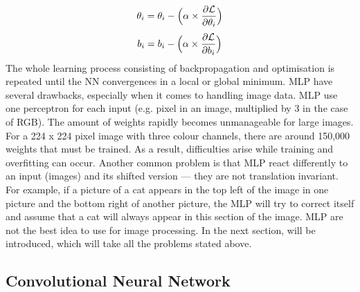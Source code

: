 \begin{equation}
    \centering
    \theta_i = \theta_i - \Big(\alpha \times \frac{\partial \mathcal{L}}{\partial\theta_i}\Big)
    \label{eq:Optimisation-Gradient-Descent-Weights}
\end{equation}
\begin{equation}
    \centering
    b_i = b_i - \Big(\alpha \times \frac{\partial \mathcal{L}}{\partial b_i}\Big)
    \label{eq:Optimisation-Gradient-Descent-Bias}
\end{equation}
The whole learning process consisting of backpropagation and optimisation is repeated until the \gls{NN} convergences in a local or global minimum.
\newline
\newline
\gls{MLP} have several drawbacks, especially when it comes to handling image data. \gls{MLP} use one perceptron for each input (e.g. pixel in an image, multiplied by 3 in the case of RGB). The amount of weights rapidly becomes unmanageable for large images. For a 224 x 224 pixel image with three colour channels, there are around 150,000 weights that must be trained. As a result, difficulties arise while training and overfitting can occur. Another common problem is that \gls{MLP} react differently to an input (images) and its shifted version — they are not translation invariant. For example, if a picture of a cat appears in the top left of the image in one picture and the bottom right of another picture, the \gls{MLP} will try to correct itself and assume that a cat will always appear in this section of the image. \gls{MLP} are not the best idea to use for image processing. In the next section,  will be introduced, which will take all the problems stated above.

\subsection{Convolutional Neural Network}
\label{sub:Convolutional-Neural-Network}

